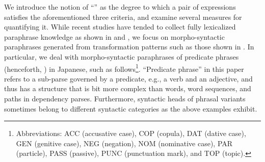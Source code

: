 \documentclass[english]{jnlp_1.4}
\renewcommand{\emph}[1]{}
\begin{document}
We introduce the notion of ``\emph{appropriateness as paraphrases}''
as the degree to which a pair of expressions satisfies the
aforementioned three criteria, and examine several measures for
quantifying it.
While recent studies have tended to collect fully lexicalized
paraphrase knowledge as shown in  and , we
focus on morpho-syntactic paraphrases generated from transformation
patterns such as those shown in .
In particular, we deal with morpho-syntactic paraphrases of predicate
phrases (henceforth, \emph{phrasal variants}) in Japanese, such as
follows\footnote{Abbreviations: \textsc{ACC} (accusative case),
  \textsc{COP} (copula), \textsc{DAT} (dative case), \textsc{GEN}
  (genitive case), \textsc{NEG} (negation), \textsc{NOM} (nominative
  case), \textsc{PAR} (particle), \textsc{PASS} (passive),
  \textsc{PUNC} (punctuation mark), and \textsc{TOP} (topic).}.
``Predicate phrase'' in this paper refers to a sub-parse governed by a
predicate, e.g., a verb and an adjective, and thus has a structure
that is bit more complex than words, word sequences, and paths in
dependency parses.  Furthermore, syntactic heads of phrasal variants
sometimes belong to different syntactic categories as the above
examples exhibit.
\end{document}
